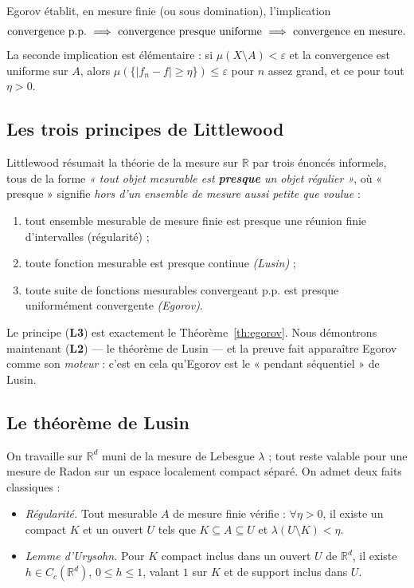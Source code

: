 \documentclass[11pt,a4paper]{article}
\theoremstyle{plain}
\theoremstyle{definition}
\newcommand{\R}{\mathbb{R}}
\newcommand{\1}{\mathbf{1}}
\newcommand{\abs}[1]{\left|#1\right|}
\newcommand{\pp}{\text{p.p.}}
\begin{document}
Egorov établit, en mesure finie (ou sous domination), l'implication
\[
  \text{convergence \pp}\ \Longrightarrow\ \text{convergence presque uniforme}
  \ \Longrightarrow\ \text{convergence en mesure}.
\]
La seconde implication est élémentaire : si $\mu(X\setminus A)<\varepsilon$ et la
convergence est uniforme sur $A$, alors $\mu(\{\abs{f_n-f}\ge\eta\})\le\varepsilon$
pour $n$ assez grand, et ce pour tout $\eta>0$.

\subsection*{Les trois principes de Littlewood}

Littlewood résumait la théorie de la mesure sur $\R$ par trois énoncés informels,
tous de la forme \emph{« tout objet mesurable est \textbf{presque} un objet
régulier »}, où « presque » signifie \emph{hors d'un ensemble de mesure aussi petite
que voulue} :
\begin{enumerate}[label=(\textbf{L\arabic*}),leftmargin=2.4em,itemsep=2pt,topsep=3pt]
\item tout ensemble mesurable de mesure finie est presque une réunion finie
      d'intervalles (régularité) ;
\item toute fonction mesurable est presque continue \emph{(Lusin)} ;
\item toute suite de fonctions mesurables convergeant p.p. est presque
      uniformément convergente \emph{(Egorov)}.
\end{enumerate}
Le principe (\textbf{L3}) est exactement le Théorème~\ref{th:egorov}. Nous
démontrons maintenant (\textbf{L2}) — le théorème de Lusin — et la preuve fait
apparaître Egorov comme son \emph{moteur} : c'est en cela qu'Egorov est le
« pendant séquentiel » de Lusin.

\subsection*{Le théorème de Lusin}

On travaille sur $\R^d$ muni de la mesure de Lebesgue $\lambda$ ; tout reste valable
pour une mesure de Radon sur un espace localement compact séparé. On admet deux
faits classiques :
\begin{itemize}[leftmargin=2.2em,itemsep=2pt,topsep=3pt]
\item[\textbf{(R)}] \emph{Régularité.} Tout mesurable $A$ de mesure finie vérifie :
      $\forall\eta>0$, il existe un compact $K$ et un ouvert $U$ tels que
      $K\subseteq A\subseteq U$ et $\lambda(U\setminus K)<\eta$.
\item[\textbf{(U)}] \emph{Lemme d'Urysohn.} Pour $K$ compact inclus dans un ouvert
      $U$ de $\R^d$, il existe $h\in C_c(\R^d)$, $0\le h\le1$, valant $1$ sur $K$ et
      de support inclus dans $U$.
\end{itemize}
\end{document}
